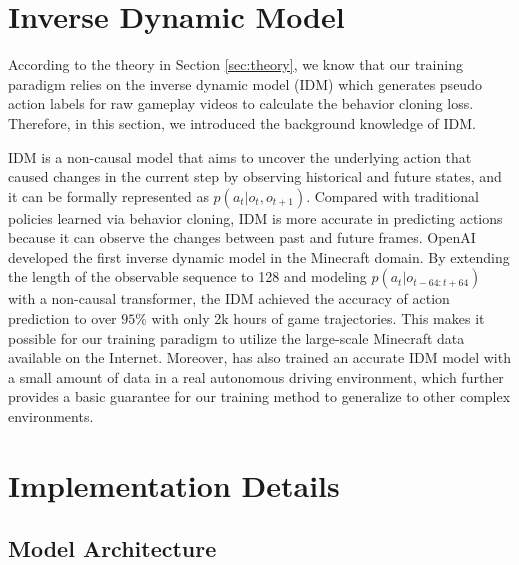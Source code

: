 \documentclass[11pt, a4paper, logo, one column]{craftjarvis}
\begin{document}
\section{Inverse Dynamic Model} \label{sec:IDM}
According to the theory in Section \ref{sec:theory}, we know that our training paradigm relies on the inverse dynamic model (IDM) which generates pseudo action labels for raw gameplay videos to calculate the behavior cloning loss. Therefore, in this section, we introduced the background knowledge of IDM. 

IDM is a non-causal model that aims to uncover the underlying action that caused changes in the current step by observing historical and future states, and it can be formally represented as $p(a_t | o_t, o_{t+1})$. Compared with traditional policies learned via behavior cloning, IDM is more accurate in predicting actions because it can observe the changes between past and future frames. OpenAI \citep{vpt} developed the first inverse dynamic model in the Minecraft domain. By extending the length of the observable sequence to 128 and modeling $p(a_t | o_{t-64:t + 64})$ with a non-causal transformer, the IDM achieved the accuracy of action prediction to over $95\%$ with only 2k hours of game trajectories. This makes it possible for our training paradigm to utilize the large-scale Minecraft data available on the Internet. Moreover, \cite{eccvpt} has also trained an accurate IDM model with a small amount of data in a real autonomous driving environment, which further provides a basic guarantee for our training method to generalize to other complex environments. 


\section{Implementation Details} \label{appendix:implementation}

\subsection{Model Architecture}
\end{document}
